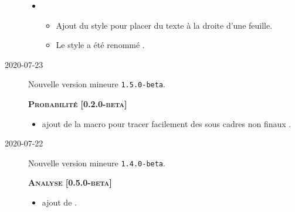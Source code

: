 \documentclass[12pt,a4paper]{book}
\begin{document}
\begin{description}
    \begin{itemize}[itemsep=.5em]
        \item {}
        \begin{itemize}[itemsep=.5em]
            \item Ajout du style  pour placer du texte à la droite d'une feuille.
    
            \item Le style  a été renommé .
        \end{itemize}
    
        
    \end{itemize}
    
    
    \separation


    \medskip
    \item[2020-07-23] Nouvelle version mineure \verb+1.5.0-beta+.
    
    
    
    
    \begin{center}
        \textbf{\textsc{Probabilité [0.2.0-beta]}}
    \end{center}
    
    \begin{itemize}[itemsep=.5em]
        \item {}
              ajout de la macro  pour tracer facilement des sous cadres non \og finaux \fg.
    
        
    \end{itemize}
    
    
    \separation


    \medskip
    \item[2020-07-22] Nouvelle version mineure \verb+1.4.0-beta+.
    
    
    
    
    \begin{center}
        \textbf{\textsc{Analyse [0.5.0-beta]}}
    \end{center}
    
    \begin{itemize}[itemsep=.5em]
        \item {}
              ajout de .
    

\end{itemize}
\end{description}
\end{document}
